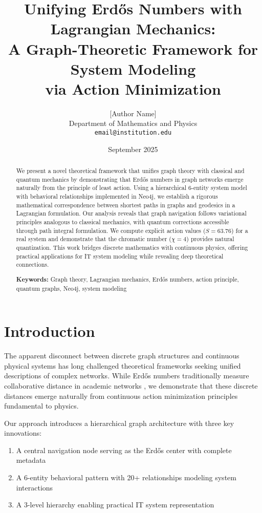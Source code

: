\documentclass[12pt,a4paper]{article}
\title{Unifying Erdős Numbers with Lagrangian Mechanics:\\
A Graph-Theoretic Framework for System Modeling\\
via Action Minimization}
\author{[Author Name]\\
Department of Mathematics and Physics\\
\texttt{email@institution.edu}}
\date{September 2025}
\begin{document}
\maketitle

\begin{abstract}
We present a novel theoretical framework that unifies graph theory with classical and quantum mechanics by demonstrating that Erdős numbers in graph networks emerge naturally from the principle of least action. Using a hierarchical 6-entity system model with behavioral relationships implemented in Neo4j, we establish a rigorous mathematical correspondence between shortest paths in graphs and geodesics in a Lagrangian formulation. Our analysis reveals that graph navigation follows variational principles analogous to classical mechanics, with quantum corrections accessible through path integral formulation. We compute explicit action values ($S = 63.76$) for a real system and demonstrate that the chromatic number ($\chi = 4$) provides natural quantization. This work bridges discrete mathematics with continuous physics, offering practical applications for IT system modeling while revealing deep theoretical connections.

\textbf{Keywords:} Graph theory, Lagrangian mechanics, Erdős numbers, action principle, quantum graphs, Neo4j, system modeling
\end{abstract}

\section{Introduction}

The apparent disconnect between discrete graph structures and continuous physical systems has long challenged theoretical frameworks seeking unified descriptions of complex networks. While Erdős numbers traditionally measure collaborative distance in academic networks \cite{erdos1959}, we demonstrate that these discrete distances emerge naturally from continuous action minimization principles fundamental to physics.

Our approach introduces a hierarchical graph architecture with three key innovations:
\begin{enumerate}
    \item A central navigation node serving as the Erdős center with complete metadata
    \item A 6-entity behavioral pattern with 20+ relationships modeling system interactions
    \item A 3-level hierarchy enabling practical IT system representation
\end{enumerate}
\end{document}
